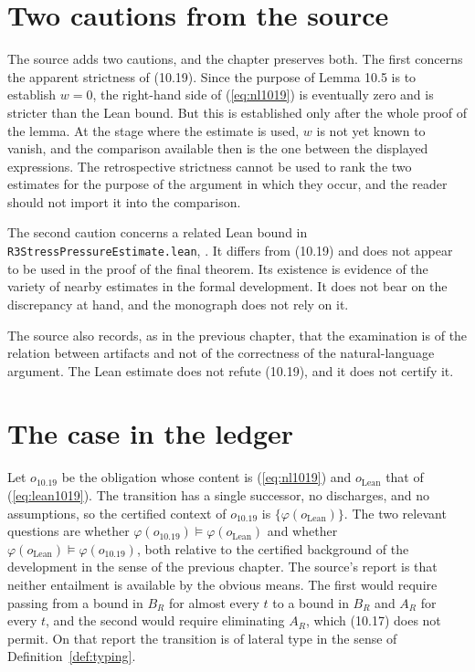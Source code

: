 \section{Two cautions from the source}

The source adds two cautions, and the chapter preserves both. The first concerns the apparent strictness of (10.19). Since the purpose of Lemma 10.5 is to establish $w = 0$, the right-hand side of (\ref{eq:nl1019}) is eventually zero and is stricter than the Lean bound. But this is established only after the whole proof of the lemma. At the stage where the estimate is used, $w$ is not yet known to vanish, and the comparison available then is the one between the displayed expressions. The retrospective strictness cannot be used to rank the two estimates for the purpose of the argument in which they occur, and the reader should not import it into the comparison.

The second caution concerns a related Lean bound in \texttt{R3StressPressureEstimate.lean}, . It differs from (10.19) and does not appear to be used in the proof of the final theorem. Its existence is evidence of the variety of nearby estimates in the formal development. It does not bear on the discrepancy at hand, and the monograph does not rely on it.

The source also records, as in the previous chapter, that the examination is of the relation between artifacts and not of the correctness of the natural-language argument. The Lean estimate does not refute (10.19), and it does not certify it.

\section{The case in the ledger}

Let $o_{10.19}$ be the obligation whose content is (\ref{eq:nl1019}) and $o_{\mathrm{Lean}}$ that of (\ref{eq:lean1019}). The transition has a single successor, no discharges, and no assumptions, so the certified context of $o_{10.19}$ is $\{\varphi(o_{\mathrm{Lean}})\}$. The two relevant questions are whether $\varphi(o_{10.19}) \models \varphi(o_{\mathrm{Lean}})$ and whether $\varphi(o_{\mathrm{Lean}}) \models \varphi(o_{10.19})$, both relative to the certified background of the development in the sense of the previous chapter. The source's report is that neither entailment is available by the obvious means. The first would require passing from a bound in $B_R$ for almost every $t$ to a bound in $B_R$ and $A_R$ for every $t$, and the second would require eliminating $A_R$, which (10.17) does not permit. On that report the transition is of lateral type in the sense of Definition~\ref{def:typing}.

